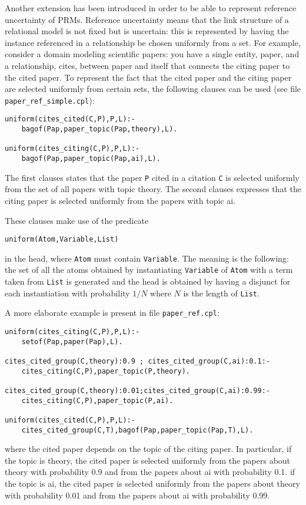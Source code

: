 \documentclass{article}
\begin{document}
Another extension has been introduced in order to be able to represent  reference uncertainty of PRMs. Reference uncertainty means that the link structure of a relational model is not fixed but is uncertain: this is represented by having the instance referenced in a relationship be chosen uniformly from a set. For example, consider a domain modeling scientific papers: you have a single entity, paper, and a relationship, cites, between paper and itself that connects the citing paper to the cited paper. To represent the fact that the cited paper and the citing paper are selected uniformly from certain sets, the following clauses can be used (see file \verb|paper_ref_simple.cpl|):
\begin{verbatim}
uniform(cites_cited(C,P),P,L):-
    bagof(Pap,paper_topic(Pap,theory),L).

uniform(cites_citing(C,P),P,L):-
    bagof(Pap,paper_topic(Pap,ai),L).
\end{verbatim}
The first clauses states that the  paper \texttt{P} cited in a citation \texttt{C} is selected uniformly from the set of all papers with topic theory.
The second clauses expresses that the citing paper is selected uniformly from the papers with
topic ai.

These clauses make use of the predicate
\begin{verbatim}
uniform(Atom,Variable,List)
\end{verbatim}
in the head, where \texttt{Atom} must contain \texttt{Variable}. The meaning is the following: the set of all the atoms obtained by instantiating \texttt{Variable} of \texttt{Atom} with a term taken from \texttt{List} is generated and the head is obtained by having a disjunct for each instantiation with probability $1/N$ where $N$ is the length of \texttt{List}.


A more elaborate example is present in file \verb|paper_ref.cpl|:
\begin{verbatim}
uniform(cites_citing(C,P),P,L):-
    setof(Pap,paper(Pap),L).

cites_cited_group(C,theory):0.9 ; cites_cited_group(C,ai):0.1:-
    cites_citing(C,P),paper_topic(P,theory).

cites_cited_group(C,theory):0.01;cites_cited_group(C,ai):0.99:-
    cites_citing(C,P),paper_topic(P,ai).

uniform(cites_cited(C,P),P,L):-
    cites_cited_group(C,T),bagof(Pap,paper_topic(Pap,T),L).
\end{verbatim}
where the cited paper depends on the topic of the citing paper. In particular, if the topic is theory, the cited paper is selected uniformly  from the papers about theory with probability 0.9 and from the papers about ai with probability 0.1. if the topic is ai, the cited paper is selected uniformly  from the papers about theory with probability 0.01 and from the papers about ai with probability 0.99.
\end{document}
